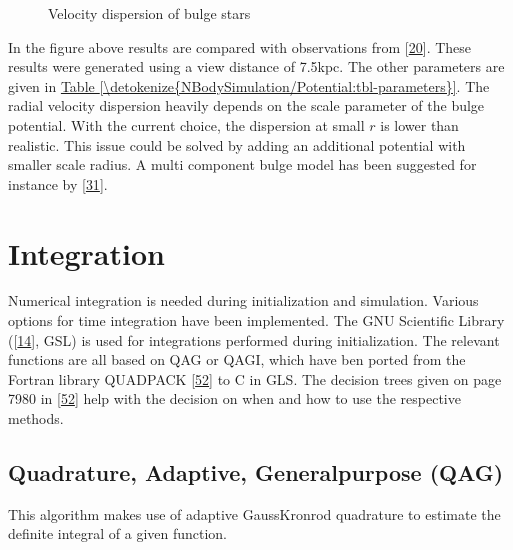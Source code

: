 \documentclass[letterpaper,10pt,english]{sphinxmanual}
\begin{document}
\begin{figure}[htbp]
\centering
\capstart

\noindent{}
\caption{Velocity dispersion of bulge stars}\label{\detokenize{NBodySimulation/Initialization:id46}}\end{figure}

\sphinxAtStartPar
In the figure above results are compared with observations from {[}\hyperlink{cite.NBodySimulation/Appendix:id21}{20}{]}. These results were generated using a view distance of 7.5kpc.
The other parameters are given in \hyperref[\detokenize{NBodySimulation/Potential:tbl-parameters}]{Table \ref{\detokenize{NBodySimulation/Potential:tbl-parameters}}}. The radial velocity dispersion heavily depends on the scale parameter of the bulge potential.
With the current choice, the dispersion at small \(r\) is lower than realistic. This issue could be solved by adding an additional potential with smaller scale radius.
A multi component bulge model has been suggested for instance by {[}\hyperlink{cite.NBodySimulation/Appendix:id22}{31}{]}.


\chapter{Integration}
\label{\detokenize{NBodySimulation/Integration:integration}}\label{\detokenize{NBodySimulation/Integration::doc}}
\sphinxAtStartPar
Numerical integration is needed during initialization and simulation.
Various options for time integration have been implemented.
The GNU Scientific Library ({[}\hyperlink{cite.NBodySimulation/Appendix:id24}{14}{]}, GSL) is used for integrations performed during initialization.
The relevant functions are all based on QAG or QAGI, which have ben ported from the Fortran library QUADPACK {[}\hyperlink{cite.NBodySimulation/Appendix:id25}{52}{]} to C in GLS.
The decision trees given on page 79\sphinxhyphen{}80 in {[}\hyperlink{cite.NBodySimulation/Appendix:id25}{52}{]} help with the decision on when and how to use the respective methods.


\section{Quadrature, Adaptive, General\sphinxhyphen{}purpose (QAG)}
\label{\detokenize{NBodySimulation/Integration:quadrature-adaptive-general-purpose-qag}}
\sphinxAtStartPar
This algorithm makes use of adaptive Gauss\sphinxhyphen{}Kronrod quadrature to estimate the definite integral of a given function.
\end{document}
